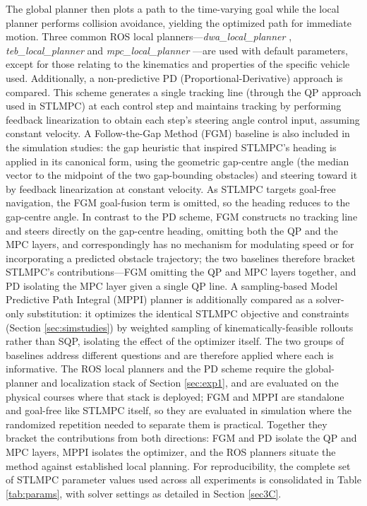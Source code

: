 \documentclass[journal]{IEEEtran}
\begin{document}
The global planner then plots a path to the time-varying goal while the local planner performs collision avoidance, yielding the optimized path for immediate motion. Three common ROS local planners---\textit{dwa\_local\_planner} \cite{DWA}, \textit{teb\_local\_planner} \cite{TEB} and \textit{mpc\_local\_planner} \cite{MPC_Planner}---are used with default parameters, except for those relating to the kinematics and properties of the specific vehicle used. Additionally, a non-predictive PD (Proportional-Derivative) approach \cite{PD} is compared. This scheme generates a single tracking line (through the QP approach used in STLMPC) at each control step and maintains tracking by performing feedback linearization to obtain each step's steering angle control input, assuming constant velocity. A Follow-the-Gap Method (FGM) baseline \cite{Sezer2012} is also included in the simulation studies: the gap heuristic that inspired STLMPC's heading is applied in its canonical form, using the geometric gap-centre angle (the median vector to the midpoint of the two gap-bounding obstacles) and steering toward it by feedback linearization at constant velocity. As STLMPC targets goal-free navigation, the FGM goal-fusion term is omitted, so the heading reduces to the gap-centre angle. In contrast to the PD scheme, FGM constructs no tracking line and steers directly on the gap-centre heading, omitting both the QP and the MPC layers, and correspondingly has no mechanism for modulating speed or for incorporating a predicted obstacle trajectory; the two baselines therefore bracket STLMPC's contributions---FGM omitting the QP and MPC layers together, and PD isolating the MPC layer given a single QP line. A sampling-based Model Predictive Path Integral (MPPI) planner \cite{Williams2016} is additionally compared as a solver-only substitution: it optimizes the identical STLMPC objective and constraints (Section \ref{sec:simstudies}) by weighted sampling of kinematically-feasible rollouts rather than SQP, isolating the effect of the optimizer itself. The two groups of baselines address different questions and are therefore applied where each is informative. The ROS local planners and the PD scheme require the global-planner and localization stack of Section \ref{sec:exp1}, and are evaluated on the physical courses where that stack is deployed; FGM and MPPI are standalone and goal-free like STLMPC itself, so they are evaluated in simulation where the randomized repetition needed to separate them is practical. Together they bracket the contributions from both directions: FGM and PD isolate the QP and MPC layers, MPPI isolates the optimizer, and the ROS planners situate the method against established local planning. For reproducibility, the complete set of STLMPC parameter values used across all experiments is consolidated in Table \ref{tab:params}, with solver settings as detailed in Section \ref{sec3C}.
\end{document}
